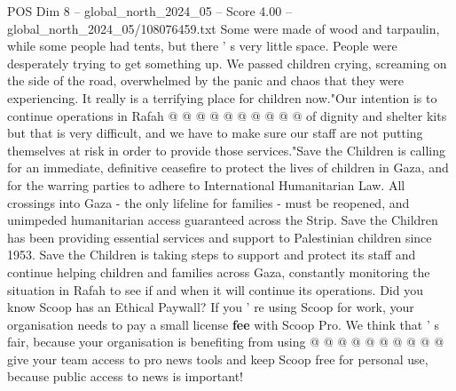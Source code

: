 \begin{textsample}{POS Dim 8 – global\_north\_2024\_05 – Score 4.00 – global\_north\_2024\_05/108076459.txt}
Some were made of wood and tarpaulin, while some people had tents, but there ' s very little space.
People were desperately trying to get something up.
We passed children crying, screaming on the side of the road, overwhelmed by the panic and chaos that they were experiencing.
It really is a terrifying place for children now."Our intention is to continue operations in Rafah @ @ @ @ @ @ @ @ @ @ of dignity and shelter kits but that is very difficult, and we have to make sure our staff are not putting themselves at risk in order to provide those services."Save the Children is calling for an immediate, definitive ceasefire to protect the lives of children in Gaza, and for the warring parties to adhere to International Humanitarian Law.
All crossings into Gaza - the only lifeline for families - must be reopened, and unimpeded humanitarian access guaranteed across the Strip.
Save the Children has been providing essential services and support to Palestinian children since 1953.
Save the Children is taking steps to support and protect its staff and continue helping children and families across Gaza, constantly monitoring the situation in Rafah to see if and when it will continue its operations.
Did you know Scoop has an Ethical Paywall?
If you ' re using Scoop for work, your organisation needs to pay a small license \textbf{fee} with Scoop Pro.
We think that ' s fair, because your organisation is benefiting from using @ @ @ @ @ @ @ @ @ @ give your team access to pro news tools and keep Scoop free for personal use, because public access to news is important!

\end{textsample}
